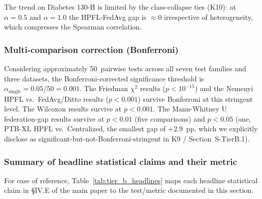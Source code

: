 \documentclass[conference]{IEEEtran}
\begin{document}
\begin{table}[htbp]
\centering
\caption{Spearman $\rho$ correlation between non-IID severity ($1/\alpha$) and the HPFL$-$FedAvg accuracy gap, per dataset. Positive on all three datasets; significant on PTB-XL and Cardiovascular; trend on Diabetes 130-H limited by class-collapse ties.}
\label{tab:tier_b_spearman}
\small
{}

\vspace{1mm}
\footnotesize{The trend on Diabetes 130-H is limited by the class-collapse ties (K10): at $\alpha{=}0.5$ and $\alpha{=}1.0$ the HPFL-FedAvg gap is $\approx 0$ irrespective of heterogeneity, which compresses the Spearman correlation.}
\end{table}

\subsubsection*{Multi-comparison correction (Bonferroni)}

Considering approximately 50~pairwise tests across all seven test families and three datasets, the Bonferroni-corrected significance threshold is $\alpha_{\text{single}}{=}0.05/50{=}0.001$. The Friedman $\chi^2$ results ($p<10^{-15}$) and the Nemenyi HPFL vs.\ FedAvg/Ditto results ($p<0.001$) survive Bonferroni at this stringent level. The Wilcoxon results survive at $p<0.001$. The Mann-Whitney U federation-gap results survive at $p<0.01$ (five comparisons) and $p<0.05$ (one, PTB-XL HPFL vs.\ Centralized, the smallest gap of $+$2.9~pp, which we explicitly disclose as significant-but-not-Bonferroni-stringent in K9 / Section~S-TierB.1).

\subsubsection*{Summary of headline statistical claims and their metric}

For ease of reference, Table~\ref{tab:tier_b_headlines} maps each headline statistical claim in §IV.E of the main paper to the test/metric documented in this section.
\end{document}
